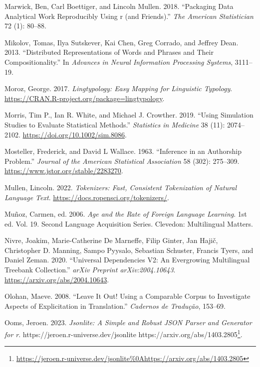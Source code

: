 \documentclass[
  letterpaper,
]{latex/krantz}
\newlength{\cslhangindent}
\newenvironment{CSLReferences}[2] %
 {\begin{list}{}{%
  \setlength{\itemindent}{0pt}
  \setlength{\leftmargin}{0pt}
  \setlength{\parsep}{0pt}
  \ifodd #1
   \setlength{\leftmargin}{\cslhangindent}
   \setlength{\itemindent}{-1\cslhangindent}
  \fi
  \setlength{\itemsep}{#2\baselineskip}}}
 {\end{list}}
\theoremstyle{definition}
\theoremstyle{remark}
\DeclareRobustCommand{\href}[2]{#2\footnote{\url{#1}}}
\begin{document}
\begin{CSLReferences}{1}{0}
Marwick, Ben, Carl Boettiger, and Lincoln Mullen. 2018. {``Packaging
Data Analytical Work Reproducibly Using r (and Friends).''} \emph{The
American Statistician} 72 (1): 80--88.

Mikolov, Tomas, Ilya Sutskever, Kai Chen, Greg Corrado, and Jeffrey
Dean. 2013. {``Distributed Representations of Words and Phrases and
Their Compositionality.''} In \emph{Advances in Neural Information
Processing Systems}, 3111--19.

Moroz, George. 2017. \emph{Lingtypology: Easy Mapping for Linguistic
Typology}. \url{https://CRAN.R-project.org/package=lingtypology}.

Morris, Tim P., Ian R. White, and Michael J. Crowther. 2019. {``Using
Simulation Studies to Evaluate Statistical Methods.''} \emph{Statistics
in Medicine} 38 (11): 2074--2102.
\url{https://doi.org/10.1002/sim.8086}.

Mosteller, Frederick, and David L Wallace. 1963. {``Inference in an
Authorship Problem.''} \emph{Journal of the American Statistical
Association} 58 (302): 275--309.
\url{https://www.jstor.org/stable/2283270}.

Mullen, Lincoln. 2022. \emph{Tokenizers: Fast, Consistent Tokenization
of Natural Language Text}. \url{https://docs.ropensci.org/tokenizers/}.

Muñoz, Carmen, ed. 2006. \emph{Age and the Rate of Foreign Language
Learning}. 1st ed. Vol. 19. Second Language Acquisition Series.
Clevedon: Multilingual Matters.

Nivre, Joakim, Marie-Catherine De Marneffe, Filip Ginter, Jan Hajič,
Christopher D. Manning, Sampo Pyysalo, Sebastian Schuster, Francis
Tyers, and Daniel Zeman. 2020. {``Universal Dependencies V2: An
Evergrowing Multilingual Treebank Collection.''} \emph{arXiv Preprint
arXiv:2004.10643}. \url{https://arxiv.org/abs/2004.10643}.

Olohan, Maeve. 2008. {``Leave It Out! Using a Comparable Corpus to
Investigate Aspects of Explicitation in Translation.''} \emph{Cadernos
de Tradu{ç}{ã}o}, 153--69.

Ooms, Jeroen. 2023. \emph{Jsonlite: A Simple and Robust JSON Parser and
Generator for r}.
\href{https://jeroen.r-universe.dev/jsonlite\%0Ahttps://arxiv.org/abs/1403.2805}{https://jeroen.r-universe.dev/jsonlite
https://arxiv.org/abs/1403.2805}.


\end{CSLReferences}
\end{document}
